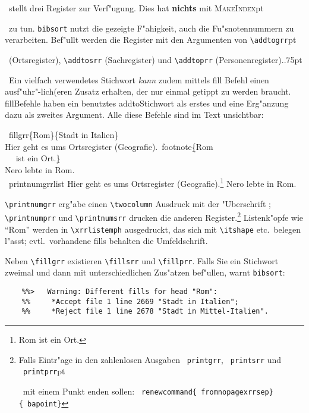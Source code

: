 \documentclass[12pt,a4paper]{article}
\newcommand{\pdfko}[1]{\kern #1pt
                          \strut\ignorespaces}%
\newcommand{\pbs}{\string\ \unskip}
\newcommand{\bs}{\protect\pbs}
\begin{document}
\BibArts\ stellt drei Register zur Verf"ugung. Dies hat \textbf{nichts} 
mit \textsc{MakeIndex}\pdfko{1}\ 
zu tun. \verb|bibsort| nutzt die gezeigte F"ahigkeit,
auch die Fu"snotennummern zu verarbeiten. Bef"ullt werden die Register mit den Argumenten von
\verb|\addtogrr|\pdfko{1.25}\ 
(Ortsregister), \verb|\addtosrr| (Sachregister) und \verb|\addtoprr|
(Personenregister).\pdfko{.75}\ 
Ein vielfach verwendetes Stichwort \textit{kann} zudem mittels fill\hy 
Befehl einen ausf"uhr"-lich{\small(}\hspace{-.05em}er\hspace{-.05em}{\small)}en 
Zusatz erhalten, der nur einmal getippt zu werden braucht. 
fill\hy Befehle haben ein benutztes addto\hy Stichwort als 
erstes und eine Erg"anzung dazu als zweites Argument.
Alle diese Befehle sind im Text unsichtbar:

\Doppelbox
{
\bs fillgrr\{Rom\}\{Stadt in Italien\}
\\[0.4ex] Hier geht es ums Ortsregister (Geografie).\bs footnote\b{\{}Rom 
\\[0.1ex] \ \bs {} ist ein Ort.\b{\}} 
\\[0.6ex] Nero lebte in Rom.\bs {} 
\\[0.6ex] \bs printnumgrrlist
}
{
Hier geht es ums Ortsregister (Geografie).\footnote{Rom 
 ist ein Ort.} 
Nero lebte in Rom.\addtogrr{Rom} 
\printnumgrrlist
}

\vspace{-.25ex}\noindent
\verb|\printnumgrr| erg"abe einen \verb|\twocolumn|\hy 
Ausdruck mit der "Uberschrift \textit{\ggrrtitlename}; 
\verb|\printnumprr| und \verb|\printnumsrr| drucken die anderen 
Register.\footnote{Falls Eintr"age in den zahlen\hy losen Ausgaben  
\texttt{\bs printgrr}, \texttt{\bs printsrr} und \texttt{\bs printprr}\pdfko{1.5}\ 
mit einem Punkt enden sollen: 
\texttt{\bs renewcommand\{\bs fromnopagexrrsep\}\{\bs bapoint\}}}
Listenk"opfe wie "`Rom"' werden in \verb|\xrrlistemph| ausgedruckt, das \label{xrr}
sich mit \verb|\itshape| etc.\ belegen l"asst; evtl.\ vorhandene fills 
behalten die Umfeldschrift.

\vspace{1ex}\noindent
Neben \verb|\fillgrr| existieren \verb|\fillsrr| und \verb|\fillprr|. 
Falls Sie ein Stichwort zweimal und dann mit unterschiedlichen 
Zus"atzen bef"ullen, warnt \verb|bibsort|:

\vspace{-.75ex}
{\scriptsize\begin{verbatim}
    %%>   Warning: Different fills for head "Rom":
    %%     *Accept file 1 line 2669 "Stadt in Italien";
    %%     *Reject file 1 line 2678 "Stadt in Mittel-Italien".
\end{verbatim}}
\end{document}
